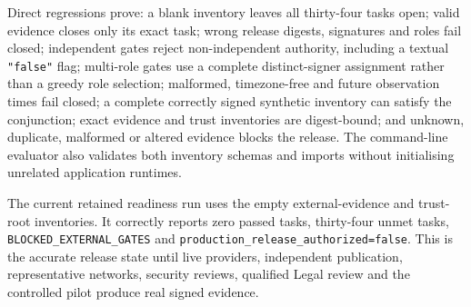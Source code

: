 Direct regressions prove: a blank inventory leaves all thirty-four tasks
open; valid evidence closes only its exact task; wrong release digests,
signatures and roles fail closed; independent gates reject non-independent
authority, including a textual \texttt{"false"} flag; multi-role gates use a
complete distinct-signer assignment rather than a greedy role selection;
malformed, timezone-free and future observation times fail closed; a complete
correctly signed synthetic inventory can satisfy the conjunction; exact evidence
and trust inventories are digest-bound; and unknown, duplicate, malformed or
altered evidence blocks the release.  The command-line evaluator also validates
both inventory schemas and imports without initialising unrelated application
runtimes.

The current retained readiness run uses the empty external-evidence and
trust-root inventories.  It correctly reports zero passed tasks, thirty-four
unmet tasks, \texttt{BLOCKED\_EXTERNAL\_GATES} and
\texttt{production\_release\_authorized=false}.  This is the accurate release
state until live providers, independent publication, representative networks,
security reviews, qualified Legal review and the controlled pilot produce real
signed evidence.
